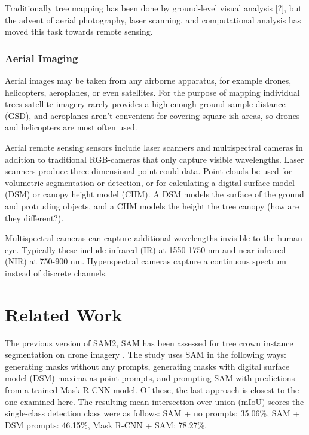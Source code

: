 \documentclass[english, 12pt, a4paper, sci, utf8, a-2b, online]{aaltothesis}
\begin{document}
Traditionally tree mapping has been done by ground-level visual analysis [?], but the advent of aerial photography, laser scanning, and computational analysis has moved this task towards remote sensing.

\subsubsection{Aerial Imaging}

Aerial images may be taken from any airborne apparatus, for example drones, helicopters, aeroplanes, or even satellites. For the purpose of mapping individual trees satellite imagery rarely provides a high enough ground sample distance (GSD), and aeroplanes aren't convenient for covering square-ish areas, so drones and helicopters are most often used.
\newline
{}
\newline

Aerial remote sensing sensors include laser scanners and multispectral cameras in addition to traditional RGB-cameras that only capture visible wavelengths. Laser scanners produce three-dimensional point could data. Point clouds be used for volumetric segmentation or detection, or for calculating a digital surface model (DSM) or canopy height model (CHM). A DSM models the surface of the ground and protruding objects, and a CHM models the height the tree canopy (how are they different?).
\newline
{}
\newline

Multispectral cameras can capture additional wavelengths invisible to the human eye. Typically these include infrared (IR) at 1550-1750 nm and near-infrared (NIR) at 750-900 nm. Hyperspectral cameras capture a continuous spectrum instead of discrete channels.
\newline
{}
\newline

\newpage
\section{Related Work}

The previous version of SAM2, SAM has been assessed for tree crown instance segmentation on drone imagery \cite{sam-treecrown}. The study uses SAM in the following ways: generating masks without any prompts, generating masks with digital surface model (DSM) maxima as point prompts, and prompting SAM with predictions from a trained Mask R-CNN model. Of these, the last approach is closest to the one examined here. The resulting mean intersection over union (mIoU) scores the single-class detection class were as follows: SAM + no prompts: 35.06\%, SAM + DSM prompts: 46.15\%, Mask R-CNN + SAM: 78.27\%.
\end{document}
